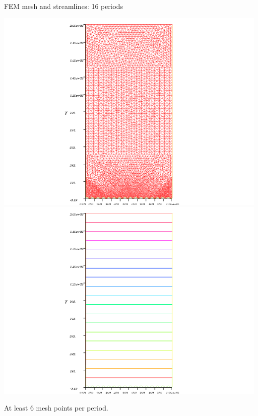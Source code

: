 \documentclass{beamer}
\begin{document}
\begin{frame}{FEM mesh and streamlines: 16 periods}

\begin{center}
\includegraphics[scale=0.4, trim=4cm 0cm 4cm 0cm, clip=true]{FEM_mesh_16.png}
\includegraphics[scale=0.4, trim=4cm 0cm 4cm 0cm, clip=true]{FEM_streamlines_16.png}
\end{center}
At least 6 mesh points per period.
\end{frame}
\end{document}
